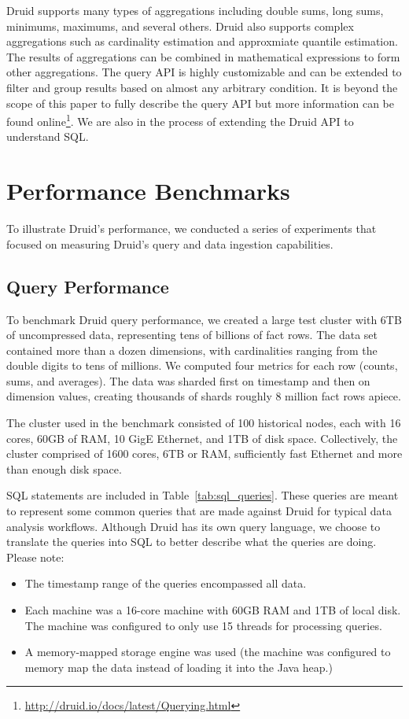 \documentclass{acm_proc_article-sp}
\begin{document}
Druid supports many types of aggregations including double sums, long sums,
minimums, maximums, and several others. Druid also supports complex aggregations
such as cardinality estimation and approxmiate quantile estimation.  The
results of aggregations can be combined in mathematical expressions to form
other aggregations. The query API is highly customizable and can be extended to
filter and group results based on almost any arbitrary condition.  It is beyond
the scope of this paper to fully describe the query API but more information
can be found
online\footnote{\href{http://druid.io/docs/latest/Querying.html}{http://druid.io/docs/latest/Querying.html}}.
We are also in the process of extending the Druid API to understand SQL.

\section{Performance Benchmarks}
\label{sec:benchmarks}
To illustrate Druid's performance, we conducted a series of experiments that
focused on measuring Druid's query and data ingestion capabilities.

\subsection{Query Performance}
To benchmark Druid query performance, we created a large test cluster with 6TB
of uncompressed data, representing tens of billions of fact rows. The data set
contained more than a dozen dimensions, with cardinalities ranging from the
double digits to tens of millions. We computed four metrics for each row
(counts, sums, and averages). The data was sharded first on timestamp and then
on dimension values, creating thousands of shards roughly 8 million fact rows
apiece.

The cluster used in the benchmark consisted of 100 historical nodes, each with
16 cores, 60GB of RAM, 10 GigE Ethernet, and 1TB of disk space. Collectively,
the cluster comprised of 1600 cores, 6TB or RAM, sufficiently fast Ethernet and
more than enough disk space.

SQL statements are included in Table~\ref{tab:sql_queries}. These queries are
meant to represent some common queries that are made against Druid for typical data
analysis workflows. Although Druid has its own query language, we choose to
translate the queries into SQL to better describe what the queries are doing.
Please note:
\begin{itemize}
\item The timestamp range of the queries encompassed all data.
\item Each machine was a 16-core machine with 60GB RAM and 1TB of local
  disk. The machine was configured to only use 15 threads for
  processing queries.
\item A memory-mapped storage engine was used (the machine was configured to memory map the data
  instead of loading it into the Java heap.)
\end{itemize}
\end{document}
